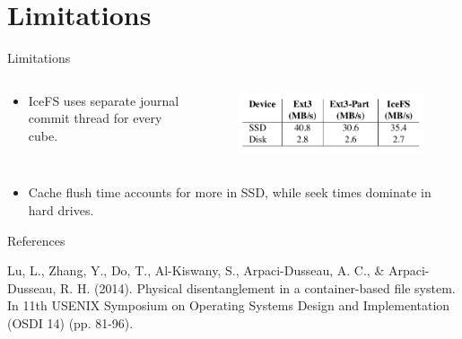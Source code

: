 \documentclass[aspectratio=169]{beamer}
\newcommand{\bi}{\begin{itemize}}
\newcommand{\ei}{\end{itemize}}
\begin{document}
\section{Limitations}
\begin{frame}{Limitations}
    \begin{columns}[T]
        \hspace{-4cm}\begin{column}{0.3\textwidth}
        \bi
    \item IceFS uses separate journal commit thread for every cube.
        \ei
    \end{column}
    \pause
    \hspace{-2cm}\begin{column}{0.3\textwidth}
        \begin{figure}
            \includegraphics[scale=0.43]{./figures/table4.png}
        \end{figure}
    \end{column}
    \end{columns}
    \pause
    \bi
\item Cache flush time accounts for more in SSD, while seek times dominate in
    hard drives.
    \ei
\end{frame}

\begin{frame}{References}
\begin{thebibliography}{9}
    Lu, L., Zhang, Y., Do, T., Al-Kiswany, S., Arpaci-Dusseau, A.
    C., \& Arpaci-Dusseau, R. H. (2014). Physical disentanglement in a
    container-based file system. In 11th USENIX Symposium on Operating Systems
    Design and Implementation (OSDI 14) (pp. 81-96).
\end{thebibliography}
\end{frame}
\end{document}
